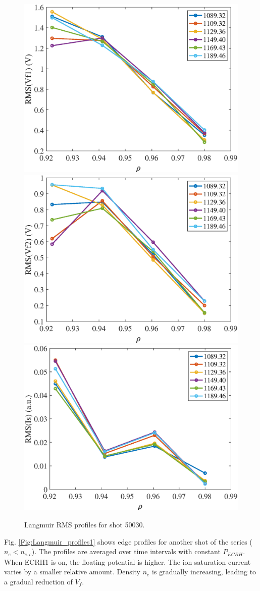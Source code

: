 \documentclass[preprint,12pt,authoryear]{elsarticle}
\begin{document}
\begin{figure}[!ht]
\centering
   \includegraphics[width=0.32\columnwidth]{Images/50030_VF1_RMS.eps}
   \includegraphics[width=0.32\columnwidth]{Images/50030_VF2_RMS.eps}
   \includegraphics[width=0.32\columnwidth]{Images/50030_Is_RMS.eps}
   \caption{Langmuir RMS profiles for shot 50030.}
   \label{Fig:Langmuir_RMSprofiles}
\end{figure}

Fig. \ref{Fig:Langmuir_profiles1} shows edge profiles for another shot of the series ($n_e < n_{e,c}$).
The profiles are averaged over time intervals with constant $P_{ECRH}$.
When ECRH1 is on, the floating potential is higher. The ion saturation current varies by a smaller relative amount.
Density $n_e$ is gradually increasing, leading to a gradual reduction of $V_f$.
\end{document}
